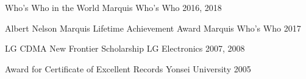 



\begin{cvhonors}

  \cvhonor
    {Who’s Who in the World} %
    {} %
    {Marquis Who’s Who} %
    {2016, 2018} %


  \cvhonor
    {Albert Nelson Marquis Lifetime Achievement Award} %
    {} %
    {Marquis Who’s Who} %
    {2017} %


  \cvhonor
    {LG CDMA New Frontier Scholarship} %
    {} %
    {LG Electronics} %
    {2007, 2008} %

  \cvhonor
    {Award for Certificate of Excellent Records} %
    {} %
    {Yonsei University} %
    {2005} %


\end{cvhonors}
